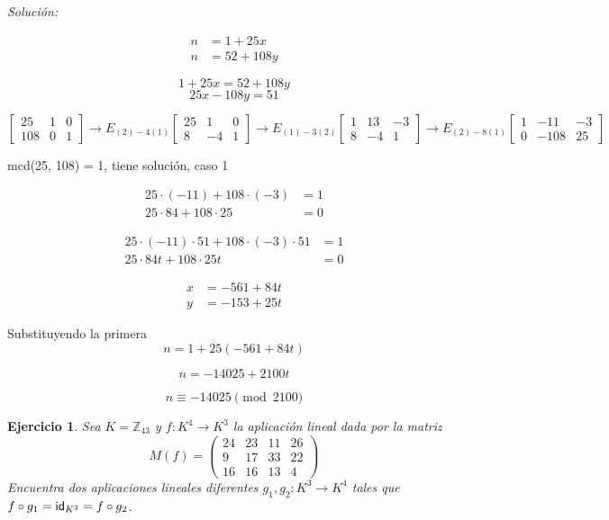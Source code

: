 \documentclass{amsart}
\newtheorem{ejer}{Ejercicio}
\begin{document}
{\it Solución: }


\begin{align*}
	n &= 1 + 25x \\
	n &= 52 + 108y
\end{align*}

$$
	1 + 25x = 52 + 108y
$$
$$
	25x - 108y = 51
$$

$$
	\left[\begin{array}{c|cc}
		25  & 1 & 0      \\
		108 & 0 & 1      
	\end{array}\right]
	\to E_{(2) - 4(1)}
	\left[\begin{array}{c|cc}
		25  &  1 & 0      \\
		8   & -4 & 1      
	\end{array}\right]
	\to E_{(1) - 3(2)}
	\left[\begin{array}{c|cc}
		1  &  13 & -3      \\
		8  & -4  &  1      
	\end{array}\right]
	\to E_{(2) - 8(1)}
	\left[\begin{array}{c|cc}
		1  & -11  & -3      \\
		0  & -108 &  25     
	\end{array}\right]
$$

mcd(25, 108) = 1, tiene solución, caso 1

\begin{align*}
	25 \cdot (-11) + 108 \cdot (-3) &= 1 \\
	25 \cdot 84 + 108 \cdot 25 &= 0
\end{align*}

\begin{align*}
	25 \cdot (-11) \cdot 51 + 108 \cdot (-3) \cdot 51 &= 1 \\
	25 \cdot 84 t + 108 \cdot 25 t &= 0
\end{align*}

\begin{align*}
	x &= -561 + 84t \\
	y &= -153 + 25t
\end{align*}

Substituyendo la primera
$$
	n = 1 + 25 (-561 + 84t)
$$

$$
	n = -14025 + 2100t
$$

$$
	n \equiv -14025 \pmod{2100}
$$


\begin{ejer}
Sea $K = {\mathbb Z}_{43}$ y $f:K^4 \to K^3$ la aplicación lineal
dada por la matriz $$M(f) = \left(\begin{array}{rrrr}
24 & 23 & 11 & 26 \\
9 & 17 & 33 & 22 \\
16 & 16 & 13 & 4
\end{array}\right)$$
Encuentra dos aplicaciones lineales diferentes $g_1,g_2:K^3 \to K^4$ 
tales que $f\circ g_1 = {\sf id}_{K^3} = f\circ g_2$.
\end{ejer}
\end{document}
